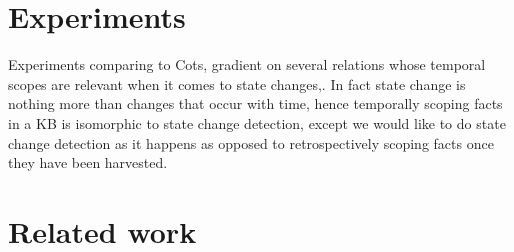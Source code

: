 \documentclass[11pt,a4paper]{article}
\begin{document}
\section{Experiments}

Experiments comparing to Cots, gradient on several relations whose
temporal scopes are relevant when it comes to state changes,.
In fact state change is nothing more than changes that occur with time, hence
temporally scoping facts in a KB is isomorphic to state change detection, except we would like
to do state change detection as it happens as opposed to retrospectively scoping facts 
once they have been harvested.


\section{Related work}
\end{document}
